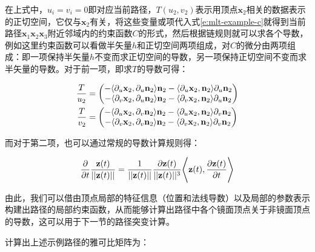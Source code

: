 在上式中，$u_i=v_i=0$即对应当前路径，$T(u_2,v_2)$表示用顶点$\mathbf{x}_2$相关的数据表示的正切空间，它仅与$\mathbf{x}_2$有关，将这些变量或项代入式\ref{e:mlt-example-c}就得到当前路径$\mathbf{x}_1\mathbf{x}_2\mathbf{x}_3$附近邻域内的约束函数$C$的形式，然后根据链规则就可以求各个导数，例如这里约束函数可以看做半矢量$h$和正切空间两项组成，对$C$的微分由两项组成：即一项保持半矢量$h$不变而求正切空间的导数，另一项保持正切空间不变而求半矢量的导数。对于前一项，即求$T$的导数可得：

\begin{equation}
\begin{aligned}
	\frac{T}{u_2}&=\begin{pmatrix}
		-\langle{\rm \partial}_u\mathbf{x}_2,{\rm \partial}_u\mathbf{n}_2\rangle\mathbf{n}_2-\langle{\rm \partial}_u\mathbf{x}_2,\mathbf{n}_2\rangle{\rm \partial}_u\mathbf{n}_2\\
		-\langle{\rm \partial}_v\mathbf{x}_2,{\rm \partial}_u\mathbf{n}_2\rangle\mathbf{n}_2-\langle{\rm \partial}_v\mathbf{x}_2,\mathbf{n}_2\rangle{\rm \partial}_u\mathbf{n}_2
	\end{pmatrix}\\
	\frac{T}{v_2}&=\begin{pmatrix}
		-\langle{\rm \partial}_u\mathbf{x}_2,{\rm \partial}_v\mathbf{n}_2\rangle\mathbf{n}_2-\langle{\rm \partial}_u\mathbf{x}_2,\mathbf{n}_2\rangle{\rm \partial}_v\mathbf{n}_2\\
		-\langle{\rm \partial}_v\mathbf{x}_2,{\rm \partial}_v\mathbf{n}_2\rangle\mathbf{n}_2-\langle{\rm \partial}_v\mathbf{x}_2,\mathbf{n}_2\rangle{\rm \partial}_v\mathbf{n}_2
	\end{pmatrix}
\end{aligned}
\end{equation}

\noindent 而对于第二项，也可以通过常规的导数计算规则得：

\begin{equation}
	\frac{{\rm \partial}}{{\rm \partial} t}\frac{\mathbf{z}(t)}{||\mathbf{z}(t)||}=\frac{1}{||\mathbf{z}(t)||}\frac{{\rm \partial}\mathbf{z}(t)}{||\mathbf{z}(t)||^{3}}\Bigg\langle\mathbf{z}(t),\frac{{\rm \partial}\mathbf{z}(t)}{{\rm \partial} t}\Bigg\rangle
\end{equation}

由此，我们可以借由顶点局部的特征信息（位置和法线导数）以及局部的参数表示构建出路径的局部约束函数，从而能够计算出路径中各个镜面顶点关于非镜面顶点的导数，这可以用于下一节的路径突变计算。

\cite{a:LIGHTTRANSPORTONPATHSPACEMANIFOLDS}计算出上述示例路径的雅可比矩阵为：

